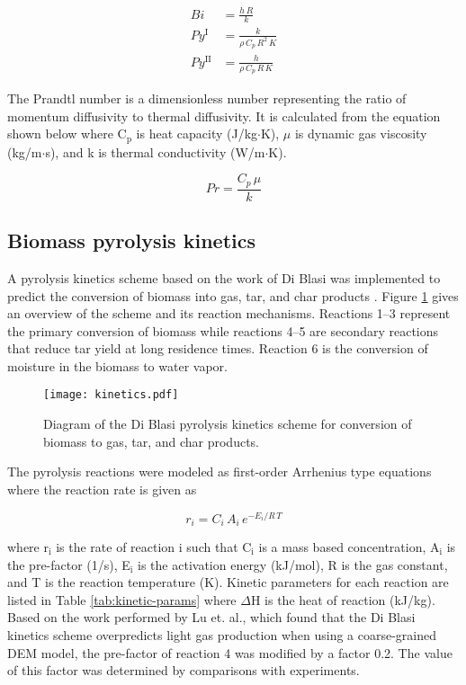 \begin{align}
    Bi &= \frac{h\,R}{k} \label{eq:biot} \\
    Py^{\textrm{I}} &= \frac{k}{\rho\,C_p\,R^2\,K} \label{eq:pynumber1} \\
    Py^{\textrm{II}} &= \frac{h}{\rho\,C_p\,R\,K} \label{eq:pynumber2}
\end{align}

The Prandtl number is a dimensionless number representing the ratio of momentum diffusivity to thermal diffusivity. It is calculated from the equation shown below where C$_\text{p}$ is heat capacity (J/kg$\cdot$K), $\mu$ is dynamic gas viscosity (kg/m$\cdot$s), and k is thermal conductivity (W/m$\cdot$K).

\begin{equation}
    Pr = \frac{C_p\, \mu}{k}
\end{equation}


\subsection{Biomass pyrolysis kinetics}

A pyrolysis kinetics scheme based on the work of Di Blasi was implemented to predict the conversion of biomass into gas, tar, and char products \cite{Blasi-1993,Blasi-2001}. Figure \ref{fig:blasi} gives an overview of the scheme and its reaction mechanisms. Reactions 1--3 represent the primary conversion of biomass while reactions 4--5 are secondary reactions that reduce tar yield at long residence times. Reaction 6 is the conversion of moisture in the biomass to water vapor.

\begin{figure}[H]
    \centering
    \texttt{[image: kinetics.pdf]}
    \caption{Diagram of the Di Blasi pyrolysis kinetics scheme for conversion of biomass to gas, tar, and char products.}
    \label{fig:blasi}
\end{figure}

The pyrolysis reactions were modeled as first-order Arrhenius type equations where the reaction rate is given as

\begin{equation}
    r_i = C_i\,A_i\,e^{-E_i / R\,T}
\end{equation}

\noindent where r$_\text{i}$ is the rate of reaction i such that C$_\text{i}$ is a mass based concentration, A$_\text{i}$ is the pre-factor (1/s), E$_\text{i}$ is the activation energy (kJ/mol), R is the gas constant, and T is the reaction temperature (K). Kinetic parameters for each reaction are listed in Table \ref{tab:kinetic-params} where $\Delta$H is the heat of reaction (kJ/kg). Based on the work performed by Lu et. al.\cite{lu2020bridging}, which found that the Di Blasi kinetics scheme overpredicts light gas production when using a coarse-grained DEM model, the pre-factor of reaction 4 was modified by a factor 0.2. The value of this factor was determined by comparisons with experiments.

